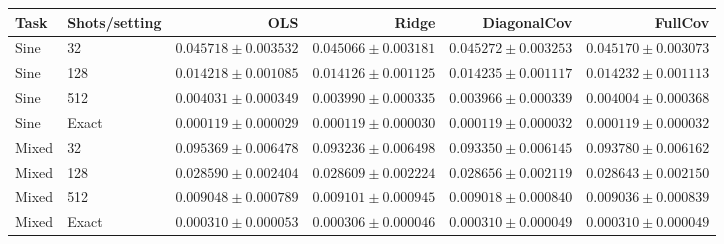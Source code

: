 \begin{tabular}{llrrrr}
\hline
Task & Shots/setting & OLS & Ridge & DiagonalCov & FullCov \\
\hline
Sine & 32 & $0.045718 \pm 0.003532$ & $0.045066 \pm 0.003181$ & $0.045272 \pm 0.003253$ & $0.045170 \pm 0.003073$ \\
Sine & 128 & $0.014218 \pm 0.001085$ & $0.014126 \pm 0.001125$ & $0.014235 \pm 0.001117$ & $0.014232 \pm 0.001113$ \\
Sine & 512 & $0.004031 \pm 0.000349$ & $0.003990 \pm 0.000335$ & $0.003966 \pm 0.000339$ & $0.004004 \pm 0.000368$ \\
Sine & Exact & $0.000119 \pm 0.000029$ & $0.000119 \pm 0.000030$ & $0.000119 \pm 0.000032$ & $0.000119 \pm 0.000032$ \\
\hline
Mixed & 32 & $0.095369 \pm 0.006478$ & $0.093236 \pm 0.006498$ & $0.093350 \pm 0.006145$ & $0.093780 \pm 0.006162$ \\
Mixed & 128 & $0.028590 \pm 0.002404$ & $0.028609 \pm 0.002224$ & $0.028656 \pm 0.002119$ & $0.028643 \pm 0.002150$ \\
Mixed & 512 & $0.009048 \pm 0.000789$ & $0.009101 \pm 0.000945$ & $0.009018 \pm 0.000840$ & $0.009036 \pm 0.000839$ \\
Mixed & Exact & $0.000310 \pm 0.000053$ & $0.000306 \pm 0.000046$ & $0.000310 \pm 0.000049$ & $0.000310 \pm 0.000049$ \\
\hline
\end{tabular}
